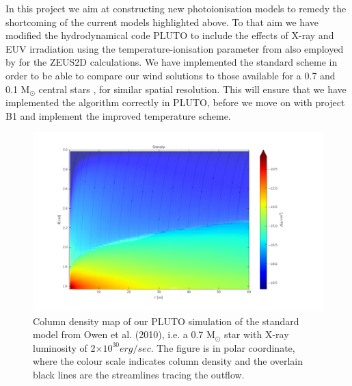 \documentclass[10pt,fleqn,twoside]{article}
\begin{document}
In this project we aim at constructing new photoionisation models to
remedy the shortcoming of the current models highlighted above. To
that aim we have modified the hydrodynamical code PLUTO 
\citep{2007ApJS..170..228M, 2012A&A...545A.152M}
to include the
effects of X-ray and EUV irradiation using the temperature-ionisation
parameter from 
\citet{2008ApJ...688..398E, 2009ApJ...699.1639E}
also employed by 
\citet{2010MNRAS.401.1415O}
for the ZEUS2D calculations. We have implemented the
standard scheme in order to be able to compare our wind solutions to 
those available for a 0.7 and 0.1 M$_\odot$ central
stars 
\citep{2010MNRAS.401.1415O, 2011MNRAS.412...13O, 2012MNRAS.422.1880O},
for similar spatial
resolution. This will ensure that we have implemented the algorithm
correctly in PLUTO, before we move on with project B1 and implement
the improved temperature scheme. 



\begin{figure}
  \includegraphics[width=0.85\linewidth]{densvel2.png}
  \caption{Column density map of our PLUTO simulation of the standard
    model from Owen et al. (2010), i.e. a 0.7 M$_{\odot}$ star with
X-ray luminosity of 2$\times 10^{30} erg/sec$. The figure is in polar coordinate,
    where the colour scale indicates column density and the overlain
    black lines are the streamlines tracing the outflow. }
  \label{fig:streamlines}
\end{figure}
\end{document}
